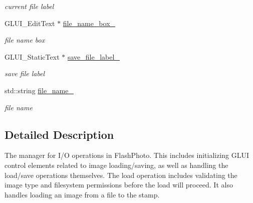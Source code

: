 \begin{DoxyCompactItemize}
\begin{DoxyCompactList}\small\item\em current file label \end{DoxyCompactList}\item 
G\+L\+U\+I\+\_\+\+Edit\+Text $\ast$ \hyperlink{classimage__tools_1_1IOManager_a15ed84bb8c67d862453aa42b5f82c0e4}{file\+\_\+name\+\_\+box\+\_\+}\hypertarget{classimage__tools_1_1IOManager_a15ed84bb8c67d862453aa42b5f82c0e4}{}\label{classimage__tools_1_1IOManager_a15ed84bb8c67d862453aa42b5f82c0e4}

\begin{DoxyCompactList}\small\item\em file name box \end{DoxyCompactList}\item 
G\+L\+U\+I\+\_\+\+Static\+Text $\ast$ \hyperlink{classimage__tools_1_1IOManager_a9e3455f1b3a0b9b827787c2e18f9a396}{save\+\_\+file\+\_\+label\+\_\+}\hypertarget{classimage__tools_1_1IOManager_a9e3455f1b3a0b9b827787c2e18f9a396}{}\label{classimage__tools_1_1IOManager_a9e3455f1b3a0b9b827787c2e18f9a396}

\begin{DoxyCompactList}\small\item\em save file label \end{DoxyCompactList}\item 
std\+::string \hyperlink{classimage__tools_1_1IOManager_a0d313490631f59d7fc0a97415b13cc5c}{file\+\_\+name\+\_\+}\hypertarget{classimage__tools_1_1IOManager_a0d313490631f59d7fc0a97415b13cc5c}{}\label{classimage__tools_1_1IOManager_a0d313490631f59d7fc0a97415b13cc5c}

\begin{DoxyCompactList}\small\item\em file name \end{DoxyCompactList}\end{DoxyCompactItemize}


\subsection{Detailed Description}
The manager for I/O operations in Flash\+Photo. This includes initializing G\+L\+UI control elements related to image loading/saving, as well as handling the load/save operations themselves. The load operation includes validating the image type and filesystem permissions before the load will proceed. It also handles loading an image from a file to the stamp. 

